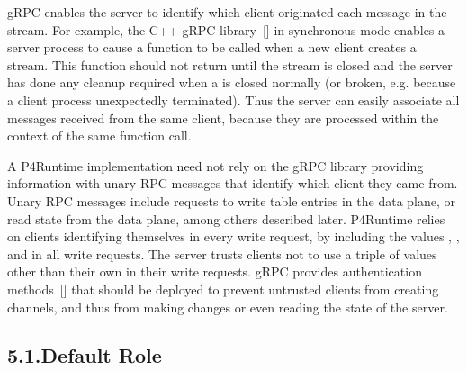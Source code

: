 \documentclass[11pt]{article}
\begin{document}
{%
\noindent{}gRPC enables the server to identify which client originated each message in the
 stream. For example, the C++ gRPC library~[] in
synchronous mode enables a server process to cause a function to be called when
a new client creates a  stream. This function should not return
until the stream is closed and the server has done any cleanup required when a
 is closed normally (or broken, e.g. because a client process
unexpectedly terminated). Thus the server can easily associate all
 messages received from the same client, because they are
processed within the context of the same function call.%

A P4Runtime implementation need not rely on the gRPC library providing
information with unary RPC messages that identify which client they came from.
Unary RPC messages include requests to write table entries in the data plane, or
read state from the data plane, among others described later. P4Runtime relies
on clients identifying themselves in every write request, by including the
values , , and  in all write requests. The
server trusts clients not to use a triple of values other than their own in
their write requests. gRPC provides authentication methods~[] that
should be deployed to prevent untrusted clients from creating channels, and thus
from making changes or even reading the state of the server.%

\subsection{5.1.\hspace*{0.5em}Default Role}\label{sec-default-role}%

}
\end{document}
